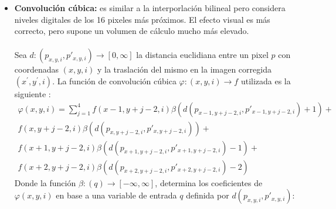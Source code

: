 \begin{itemize}
		    		\item \textbf{Convoluci\'on c\'ubica:} es similar a la interporlaci\'on bilineal pero considera niveles digitales de los 16 pixeles m\'as pr\'oximos. El efecto visual es m\'as correcto, pero supone un volumen de c\'alculo mucho m\'as elevado. \\~\\
					Sea $ d:(p_{x,y,i},p'_{x,y,i})\longrightarrow [0,\infty] $ la distancia euclidiana entre un pixel $ p $ con coordenadas $ (x,y,i) $ y la traslaci\'on del mismo en la imagen corregida $ (x^{'},y^{'},i)$. La funci\'on de convoluci\'on c\'ubica $ \varphi:(x,y,i) \longrightarrow f$ utilizada es la siguiente \cite{guide1999erdas}:
										\begin{align}
										\varphi(x,y,i) = \sum_{j=1}^{4} f(x-1,y+j-2,i)\beta(d(p_{x-1,y+j-2,i},p'_{x-1,y+j-2,i})+1)+ \nonumber \\
										f(x,y+j-2,i)\beta(d(p_{x,y+j-2,i},p'_{x,y+j-2,i}))+ \nonumber \\
										f(x+1,y+j-2,i)\beta(d(p_{x+1,y+j-2,i},p'_{x+1,y+j-2,i})-1)+ \nonumber \\
										f(x+2,y+j-2,i)\beta(d(p_{x+2,y+j-2,i},p'_{x+2,y+j-2,i})-2)
										\end{align}
					Donde la funci\'on $ \beta:(q) \longrightarrow [-\infty,\infty] $, determina los coeficientes de $ \varphi(x,y,i) $ en base a una variable de entrada $ q $ definida por $ d(p_{x,y,i},p'_{x,y,i}) $:
		    		\begin{equation}\label{ec:interCubica}

\end{equation}
\end{itemize}
